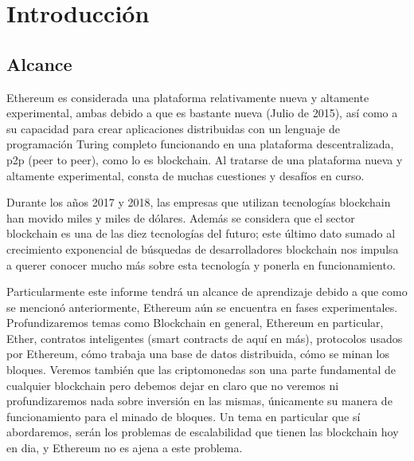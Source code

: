 
\chapter{Introducción}  %

\ifpdf
    \graphicspath{{Chapter1/Figs/Raster/}{Chapter1/Figs/PDF/}{Chapter1/Figs/}}
\else
    \graphicspath{{Chapter1/Figs/Vector/}{Chapter1/Figs/}}
\fi

\section{Alcance} %
Ethereum es considerada una plataforma relativamente nueva y altamente experimental, ambas
debido a que es bastante nueva (Julio de 2015), así como a su capacidad para
crear aplicaciones distribuidas con un lenguaje de programación Turing completo
funcionando en una plataforma descentralizada, p2p (peer to peer), como lo es blockchain.
Al tratarse de una plataforma nueva y altamente experimental, consta de muchas cuestiones y desafíos
en curso.

Durante los años 2017 y 2018, las empresas que utilizan tecnologías blockchain han movido miles y 
miles de dólares. Además se considera que el sector blockchain es una de las diez tecnologías del 
futuro; este último dato sumado al crecimiento exponencial de búsquedas de desarrolladores 
blockchain nos impulsa a querer conocer mucho más sobre esta tecnología y ponerla en funcionamiento.

Particularmente este informe tendrá un alcance de aprendizaje debido a que como se mencionó
anteriormente, Ethereum aún se encuentra en fases experimentales. Profundizaremos temas como
Blockchain en general, Ethereum en particular, Ether, contratos inteligentes (smart contracts de
aquí en más), protocolos usados por Ethereum, cómo trabaja una base de datos distribuida, cómo
se minan los bloques. Veremos también que las criptomonedas son una parte fundamental de cualquier
blockchain pero debemos dejar en claro que no veremos ni profundizaremos nada sobre inversión
en las mismas, únicamente su manera de funcionamiento para el minado de bloques.
Un tema en particular que sí abordaremos, serán los problemas de escalabilidad que tienen las 
blockchain hoy en dia, y Ethereum no es ajena a este problema.



